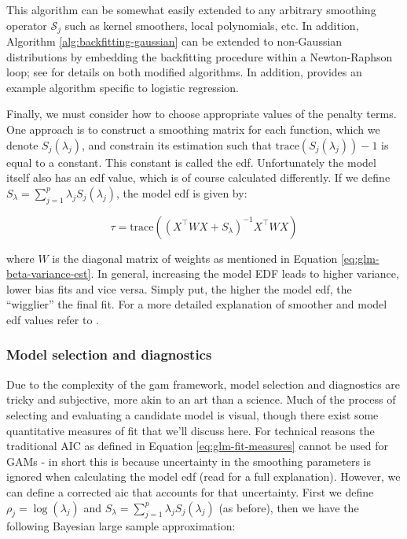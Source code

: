 \documentclass{report}
\begin{document}
This algorithm can be somewhat easily extended to any arbitrary smoothing operator $\mathcal{S}_j$ such as kernel smoothers, local polynomials, etc. In addition, Algorithm \ref{alg:backfitting-gaussian} can be extended to non-Gaussian distributions by embedding the backfitting procedure within a Newton-Raphson loop; see \cite[Lecture~14]{molstad_sta_2022} for details on both modified algorithms. In addition, \cite[Chapter~9.1.2]{hastie_elements_2009} provides an example algorithm specific to logistic regression.

Finally, we must consider how to choose appropriate values of the penalty terms. One approach is to construct a smoothing matrix for each function, which we denote $S_j(\lambda_j)$, and constrain its estimation such that $\text{trace}(S_j(\lambda_j)) - 1$ is equal to a constant. This constant is called the \gls{edf}. Unfortunately the model itself also has an \gls{edf} value, which is of course calculated differently. If we define $S_\lambda = \sum_{j=1}^p \lambda_jS_j(\lambda_j)$, the model \gls{edf} is given by:

\begin{equation}\label{eq:glm-gam-model-edf}
    \tau = \text{trace}\left(\left(X^\intercal W X + S_\lambda\right)^{-1} X^\intercal W X\right)
\end{equation}

where $W$ is the diagonal matrix of weights as mentioned in Equation \ref{eq:glm-beta-variance-est}. In general, increasing the model EDF leads to higher variance, lower bias fits and vice versa. Simply put, the higher the model \gls{edf}, the ``wigglier'' the final fit. For a more detailed explanation of smoother and model \gls{edf} values refer to \cite[Chapter~6.1.2]{wood_generalized_2017}. 

\subsubsection{Model selection and diagnostics}

Due to the complexity of the \gls{gam} framework, model selection and diagnostics are tricky and subjective, more akin to an art than a science. Much of the process of selecting and evaluating a candidate model is visual, though there exist some quantitative measures of fit that we'll discuss here. For technical reasons the traditional AIC as defined in Equation \ref{eq:glm-fit-measures} cannot be used for GAMs - in short this is because uncertainty in the smoothing parameters is ignored when calculating the model \gls{edf} (read \cite[Chapter~6.11]{wood_generalized_2017} for a full explanation). However, we can define a corrected \gls{aic} that accounts for that uncertainty. First we define $\rho_j = \log(\lambda_j)$ and $S_\lambda = \sum_{j=1}^p \lambda_jS_j(\lambda_j)$ (as before), then we have the following Bayesian large sample approximation:
\end{document}
